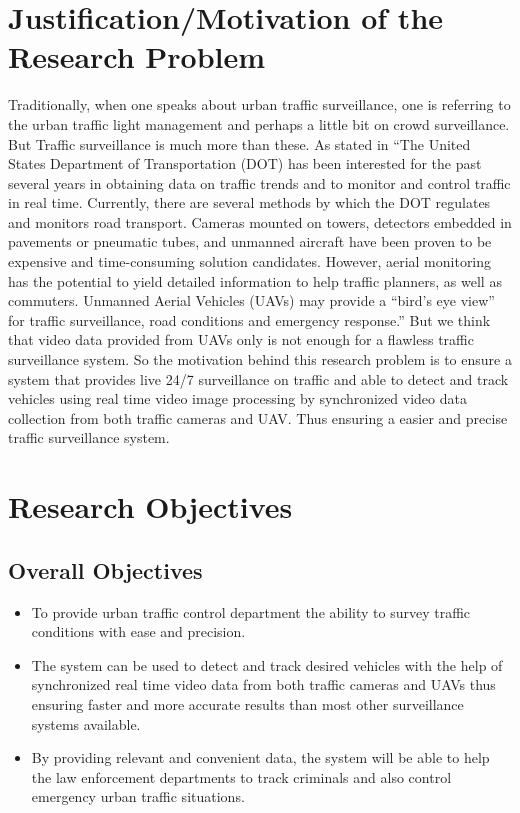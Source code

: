 \documentclass[12pt,a4paper,oneside]{article}
\begin{document}
\section{Justification/Motivation of the Research Problem}
Traditionally, when one speaks about urban traffic surveillance, one is referring to the urban traffic light management and perhaps a little bit on crowd surveillance. But Traffic surveillance is much more than these. As stated in \cite{puri2005survey} “The United States Department of Transportation (DOT) has been interested for the past several years in obtaining data on traffic trends and to monitor and control traffic in real time. Currently, there are several methods by which the DOT regulates and monitors road transport. Cameras mounted on towers, detectors embedded in pavements or pneumatic tubes, and unmanned aircraft have been proven to be expensive and time-consuming solution candidates. However, aerial monitoring has the potential to yield detailed information to help traffic planners, as well as commuters. Unmanned Aerial Vehicles (UAVs) may provide a “bird’s eye view” for traffic surveillance, road conditions and emergency response.” But we think that video data provided from UAVs only is not enough for a flawless traffic surveillance system. 
So the motivation behind this research problem is to ensure a system that provides live 24/7 surveillance on traffic and able to detect and track vehicles using real time video image processing by synchronized video data collection from both traffic cameras and UAV. Thus ensuring a easier and precise traffic surveillance system. 

\section{Research Objectives}

\subsection{Overall Objectives}

\begin{itemize}
\item To provide urban traffic control department the ability to survey traffic conditions with ease and precision. 
\item The system can be used to detect and track desired vehicles with the help of synchronized real time video data from both traffic cameras and UAVs thus ensuring faster and more accurate results than most other surveillance systems available. 

\item By providing relevant and convenient data, the system will be able to help the law enforcement departments to track criminals and also control emergency urban traffic situations.
\end{itemize}
\end{document}
